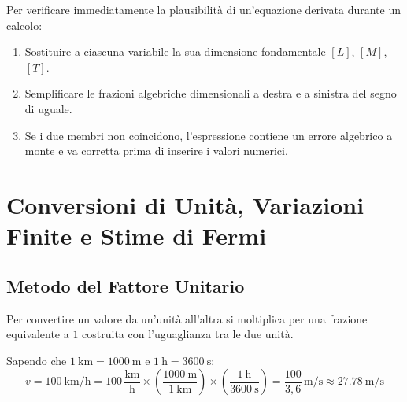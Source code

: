 \begin{center}
\end{center}

\begin{metodo}
Per verificare immediatamente la plausibilità di un'equazione derivata durante un calcolo:
\begin{enumerate}
    \item Sostituire a ciascuna variabile la sua dimensione fondamentale $[L]$, $[M]$, $[T]$.
    \item Semplificare le frazioni algebriche dimensionali a destra e a sinistra del segno di uguale.
    \item Se i due membri non coincidono, l'espressione contiene un errore algebrico a monte e va corretta prima di inserire i valori numerici.
\end{enumerate}
\end{metodo}

\section{Conversioni di Unità, Variazioni Finite e Stime di Fermi}
\label{sec:conversioni_stime}

\subsection{Metodo del Fattore Unitario}
Per convertire un valore da un'unità all'altra si moltiplica per una frazione equivalente a $1$ costruita con l'uguaglianza tra le due unità.

\begin{esempio}
Sapendo che $\SI{1}{\kilo\metre} = \SI{1000}{\metre}$ e $\SI{1}{\hour} = \SI{3600}{\second}$:
\begin{equation}
    v = \SI{100}{\kilo\metre\per\hour} = 100\,\frac{\si{\kilo\metre}}{\si{\hour}} \times \left(\frac{\SI{1000}{\metre}}{\SI{1}{\kilo\metre}}\right) \times \left(\frac{\SI{1}{\hour}}{\SI{3600}{\second}}\right) = \frac{100}{3{,}6}\,\si{\metre\per\second} \approx \SI{27.78}{\metre\per\second}
\end{equation}
\end{esempio}

